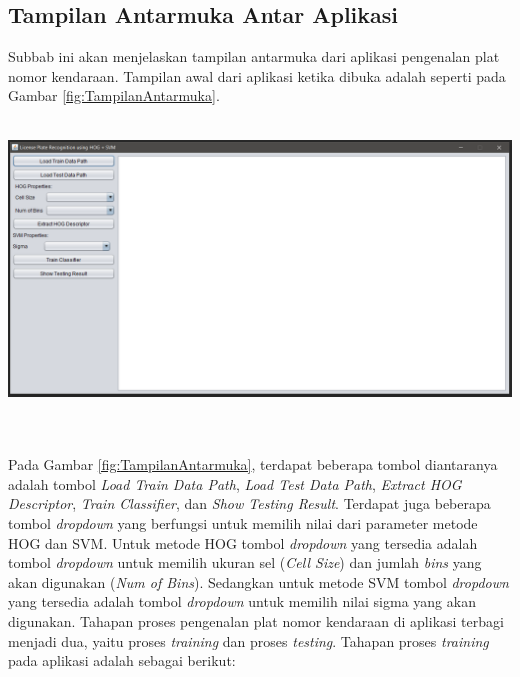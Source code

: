 \subsection{Tampilan Antarmuka Antar Aplikasi}
\noindent Subbab ini akan menjelaskan tampilan antarmuka dari aplikasi pengenalan plat nomor kendaraan. Tampilan awal dari aplikasi ketika dibuka adalah seperti pada Gambar \ref{fig:TampilanAntarmuka}. \\
\\
\begin{adjustbox}{width=1\textwidth}
	\noindent\begin{minipage}{\linewidth}
		\centering\includegraphics[width=14cm]{images/TampilanAntarmuka.png}
		\label{fig:TampilanAntarmuka}
	\end{minipage}
\end{adjustbox}\\
\\
\noindent Pada Gambar \ref{fig:TampilanAntarmuka}, terdapat beberapa tombol diantaranya adalah tombol \textit{Load Train Data Path}, \textit{Load Test Data Path}, \textit{Extract HOG Descriptor}, \textit{Train Classifier}, dan \textit{Show Testing Result}. Terdapat juga beberapa tombol \textit{dropdown} yang berfungsi untuk memilih nilai dari parameter metode HOG dan SVM. Untuk metode HOG tombol \textit{dropdown} yang tersedia adalah tombol \textit{dropdown} untuk memilih ukuran sel (\textit{Cell Size}) dan jumlah \textit{bins} yang akan digunakan (\textit{Num of Bins}). Sedangkan untuk metode SVM tombol \textit{dropdown} yang tersedia adalah tombol \textit{dropdown} untuk memilih nilai sigma yang akan digunakan. Tahapan proses pengenalan plat nomor kendaraan di aplikasi terbagi menjadi dua, yaitu proses \textit{training} dan proses \textit{testing}. Tahapan proses \textit{training} pada aplikasi adalah sebagai berikut:
